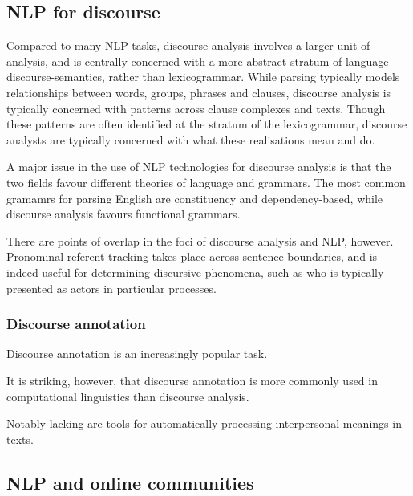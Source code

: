 

    \subsection{NLP for discourse}

    Compared to many NLP tasks, discourse analysis involves a larger unit of analysis, and is centrally concerned with a more abstract stratum of language---discourse-semantics, rather than lexicogrammar. While parsing typically models relationships between words, groups, phrases and clauses, discourse analysis is typically concerned with patterns across clause complexes and texts. Though these patterns are often identified at the stratum of the lexicogrammar, discourse analysts are typically concerned with what these realisations mean and do.

    A major issue in the use of NLP technologies for discourse analysis is that the two fields favour different theories of language and grammars. The most common gramamrs for parsing English are constituency and dependency-based, while discourse analysis favours functional grammars.

    There are points of overlap in the foci of discourse analysis and NLP, however. Pronominal referent tracking takes place across sentence boundaries, and is indeed useful for determining discursive phenomena, such as who is typically presented as actors in particular processes.

    \subsubsection{Discourse annotation}

    Discourse annotation is an increasingly popular task.

    It is striking, however, that discourse annotation is more commonly used in computational linguistics than discourse analysis. 

    Notably lacking are tools for automatically processing interpersonal meanings in texts.



    \subsection{NLP and online communities}


